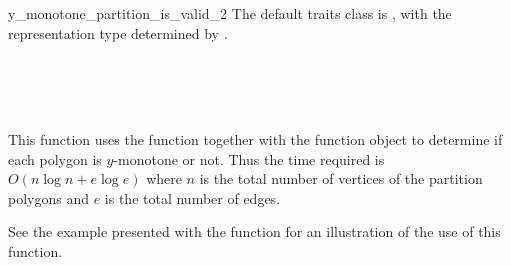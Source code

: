 \begin{ccRefFunction}{y_monotone_partition_is_valid_2}
The default traits class  is ,%
with the representation type determined by .

\ccSeeAlso

 \\
 \\
 \\

\ccImplementation

This function uses the function  together with
the function object  to determine if each polygon
is $y$-monotone or not. Thus the time required is $O(n \log n + e \log e)$ 
where $n$ is the total number of vertices of the partition polygons and
$e$ is the total number of edges.

\ccExample

See the example presented with the function 
for an illustration of the use of this function.


\end{ccRefFunction}
\renewcommand\ccRefPageBegin{\ccParDims\cgalColumnLayout}
\renewcommand\ccRefPageEnd{\ccParDims\cgalColumnLayout}
